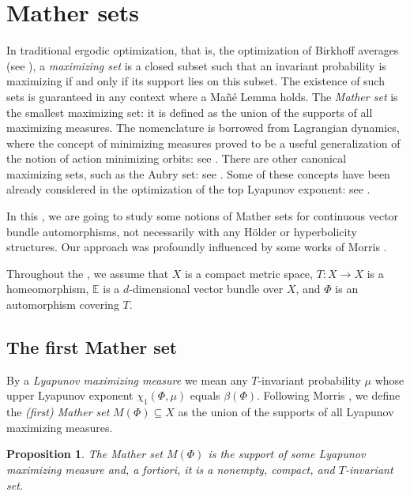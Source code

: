 \documentclass[10pt]{amsart}
\theoremstyle{plain}
\newtheorem{proposition}[theorem]{Proposition}
\theoremstyle{definition}
\newcommand{\EE}{\mathbb{E}}
\begin{document}
\section{Mather sets} \label{s.Mather}

In traditional ergodic optimization, that is, the optimization of Birkhoff averages (see
\cite{Jenkinson_survey,Jenkinson_survey_new,Garibaldi_book}), a \emph{maximizing set} is a closed subset such that an invariant probability is maximizing if and only if its support lies on this subset. The existence of such sets is guaranteed in any context where a Mañé Lemma holds.
The \emph{Mather set} is the smallest maximizing set: it is defined as the union of the supports of all maximizing measures. The nomenclature is borrowed from Lagrangian dynamics, where the concept of minimizing measures proved to be a useful generalization of the notion of action minimizing orbits: see \cite{Mat}. There are other canonical maximizing sets, such as the Aubry set: see \eg \cite{Garibaldi_book}. Some of these concepts have been already considered in the optimization of the top Lyapunov exponent: see \cite{Morris_Mather,GG}.

In this , we are going to study some notions of Mather sets for continuous vector bundle automorphisms, not necessarily with any Hölder or hyperbolicity structures. Our approach was profoundly influenced by some works of Morris \cite{Morris_rapidly,Morris_Mather}.

Throughout the , we assume that $X$ is a compact metric space, \hbox{$T \colon X \to X$} is a homeomorphism, $\EE$ is a $d$-dimensional vector bundle over $X$, and $\Phi$ is an automorphism covering $T$.

\subsection{The first Mather set}\label{ss.first_Mather}

By a \emph{Lyapunov maximizing measure} we mean any $T$-invariant probability $\mu$ whose upper Lyapunov exponent $ \chi_1(\Phi, \mu)$ equals $\beta(\Phi) $.
Following Morris \cite{Morris_Mather}, we define the \emph{(first) Mather set} $M(\Phi) \subseteq X$ as the union of the supports of all Lyapunov maximizing measures.

\begin{proposition}\label{p.Mather_support}
The Mather set $M(\Phi)$ is the support of some Lyapunov maximizing measure and, a fortiori, it is a nonempty, compact, and $T$-invariant set.
\end{proposition}
\end{document}

